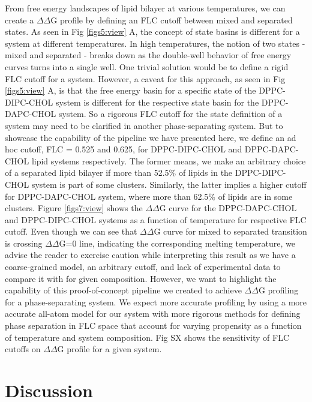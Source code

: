 \documentclass{biophys-new}
\begin{document}
From free energy landscapes of lipid bilayer at various temperatures, we can create a $\Delta\Delta$G profile by defining an FLC cutoff between mixed and separated states.
As seen in Fig \ref{figs5:view} A, the concept of state basins is different for a system at different temperatures.
In high temperatures, the notion of two states - mixed and separated - breaks down as the double-well behavior of free energy curves turns into a single well. 
One trivial solution would be to define a rigid FLC cutoff for a system.
However, a caveat for this approach, as seen in Fig \ref{figs5:view} A, is that the free energy basin for a specific state of the DPPC-DIPC-CHOL system is different for the respective state basin for the DPPC-DAPC-CHOL system.
So a rigorous FLC cutoff for the state definition of a system may need to be clarified in another phase-separating system.
But to showcase the capability of the pipeline we have presented here, we define an ad hoc cutoff, FLC = 0.525 and 0.625, for DPPC-DIPC-CHOL and DPPC-DAPC-CHOL  lipid systems respectively.   
The former means, we make an arbitrary choice of a separated lipid bilayer if more than 52.5\% of lipids in the DPPC-DIPC-CHOL system is part of some clusters.
Similarly, the latter implies a higher cutoff for DPPC-DAPC-CHOL system, where more than 62.5\% of lipids are in some clusters. 
Figure \ref{figs7:view} shows the $\Delta\Delta$G curve for the DPPC-DAPC-CHOL and DPPC-DIPC-CHOL systems as a function of temperature for respective FLC cutoff.
Even though we can see that $\Delta\Delta$G curve for mixed to separated transition is crossing $\Delta\Delta$G=0 line, indicating the corresponding melting temperature,
we advise the reader to exercise caution while interpreting this result as we have a coarse-grained model, an arbitrary cutoff, and lack of experimental data to compare it with for given composition.
However, we want to highlight the capability of this proof-of-concept pipeline we created to achieve $\Delta\Delta$G profiling for a phase-separating system.
We expect more accurate profiling by using a more accurate all-atom model for our system with more rigorous methods for defining phase separation in FLC space that account for 
varying propensity as a function of temperature and system composition.
Fig SX shows the sensitivity of FLC cutoffs on $\Delta\Delta$G profile for a given system.

\section*{Discussion}
\end{document}
